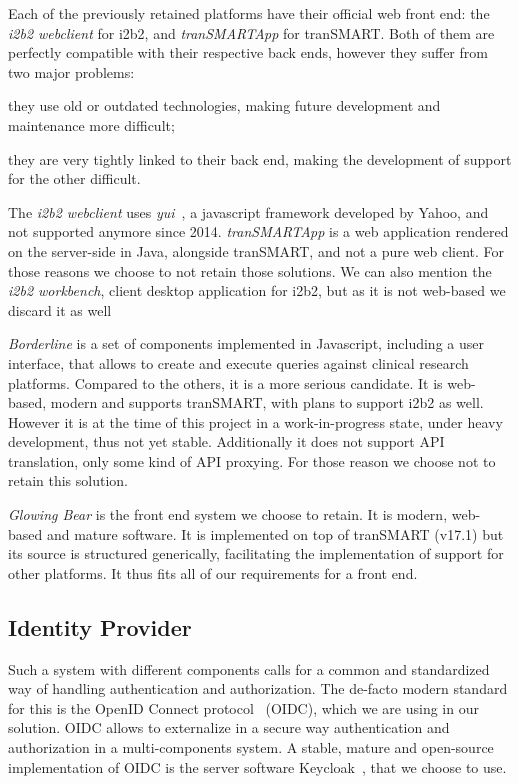 Each of the previously retained platforms have their official web front end: the \emph{i2b2 webclient} for i2b2, and \emph{tranSMARTApp} for tranSMART.
Both of them are perfectly compatible with their respective back ends, however they suffer from two major problems:
\begin{enumerate*}
    \item they use old or outdated technologies, making future development and maintenance more difficult;
    \item they are very tightly linked to their back end, making the development of support for the other difficult.
\end{enumerate*}
The \emph{i2b2 webclient} uses \emph{yui}~\cite{todo}, a javascript framework developed by Yahoo, and not supported anymore since 2014. 
\emph{tranSMARTApp} is a web application rendered on the server-side in Java, alongside tranSMART, and not a pure web client.
For those reasons we choose to not retain those solutions.
We can also mention the \emph{i2b2 workbench}, client desktop application for i2b2, but as it is not web-based we discard it as well

\emph{Borderline} is a set of components implemented in Javascript, including a user interface, that allows to create and execute queries against clinical research platforms.
Compared to the others, it is a more serious candidate. It is web-based, modern and supports tranSMART, with plans to support i2b2 as well.
However it is at the time of this project in a work-in-progress state, under heavy development, thus not yet stable.
Additionally it does not support API translation, only some kind of API proxying.
For those reason we choose not to retain this solution.

\emph{Glowing Bear} is the front end system we choose to retain.
It is modern, web-based and mature software. 
It is implemented on top of tranSMART (v17.1) but its source is structured generically, facilitating the implementation of support for other platforms.
It thus fits all of our requirements for a front end.


\subsection{Identity Provider}

Such a system with different components calls for a common and standardized way of handling authentication and authorization.
The de-facto modern standard for this is the OpenID Connect protocol~\cite{todo} (OIDC), which we are using in our solution.
OIDC allows to externalize in a secure way authentication and authorization in a multi-components system.
A stable, mature and open-source implementation of OIDC is the server software Keycloak~\cite{todo}, that we choose to use.


